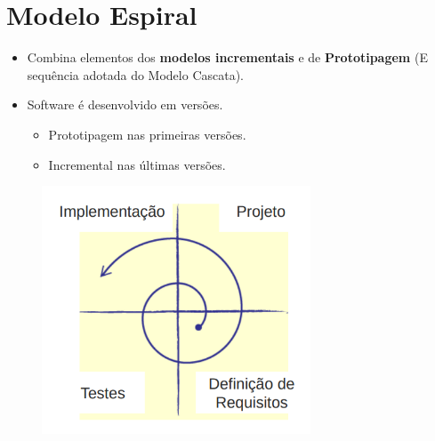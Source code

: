 \documentclass[a4paper, 11pt]{article}
\begin{document}
\section{Modelo Espiral}
\begin{itemize}
    \item Combina elementos dos \textbf{modelos incrementais} e de \textbf{Prototipagem} (E sequência adotada do Modelo Cascata).
    \item Software é desenvolvido em versões.
    \begin{itemize}
        \item Prototipagem nas primeiras versões.
        \item Incremental nas últimas versões.
    \end{itemize}
\end{itemize}

\begin{figure}[h]
    \includegraphics[width=8cm]{modelo_espiral}
    \centering
\end{figure}
\end{document}
